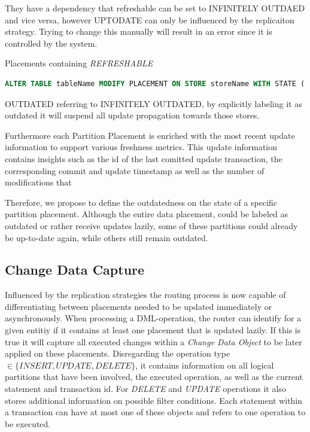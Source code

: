 They have a dependency that refreshable can be set to INFINITELY OUTDAED and vice versa, however UPTODATE can only be influenced by the replicaiton strategy.
Trying to change this manually will result in an error since it is controlled by the system.

Placements containing \emph{REFRESHABLE} 

\begin{lstlisting}[language=sql]
    ALTER TABLE tableName MODIFY PLACEMENT ON STORE storeName WITH STATE ( REFRESHABLE | OUTDATED );
\end{lstlisting}
OUTDATED referring to INFINITELY OUTDATED,  by explicitly labeling it as outdated it will suspend all update propagation towards those stores.

Furthermore each Partition Placement is enriched with the most recent update information to support various freshness metrics.
This update information contains insights such as the id of the last comitted update transaction, the corresponding commit and update timestamp as well as the number of 
modifications that 


Therefore, we propose to define the outdatedness on the state of a specific partition placement.
Although the entire data placement, could be labeled as outdated or rather receive updates lazily, some of 
these partitions could already be up-to-date again, while others still remain outdated.



\subsection{Change Data Capture}
\label{sec:cdc_impl}

Influenced by the replication strategies the routing process is now capable of differentiating between placements needed to be updated immediately or asynchronously. 
When processing a DML-operation, the router can identify for a given entitiy if it contains at least one placement that is updated lazily.
If this is true it will capture all executed changes within a \emph{Change Data Object} to be later applied on these placements. 
Disregarding the operation type $\in \{INSERT,UPDATE,DELETE\}$, it contains information on all logical partitions that have been involved, 
the executed operation, as well as the current statement and transaction id. For \emph{DELETE} and \emph{UPDATE} operations it also stores additional information on possible filter 
conditions. Each statement within a transaction can have at most one of these objects and refers to one operation to be executed.\\


